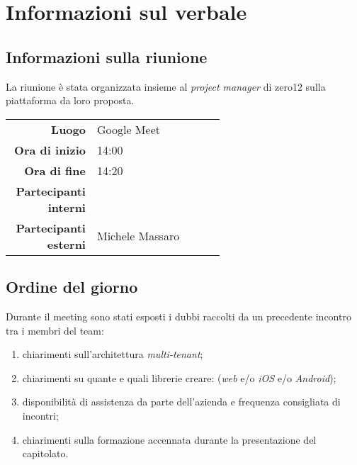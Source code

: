 \section{Informazioni sul verbale}

\subsection{Informazioni sulla riunione}
La riunione è stata organizzata insieme al \textit{project manager} di zero12 sulla piattaforma da loro proposta.

\begin{center}
	\begin{tabular}{r|p{0.6\linewidth}}
		\toprule
		\textbf{Luogo} & Google Meet \\
		\textbf{Ora di inizio} & 14:00 \\
		\textbf{Ora di fine} & 14:20 \\
		\textbf{Partecipanti interni} & \groupTeam \\
		\textbf{Partecipanti esterni} & Michele Massaro
	\end{tabular}
\end{center}

\medskip

\subsection{Ordine del giorno}
Durante il meeting sono stati esposti i dubbi raccolti da un precedente incontro tra i membri del team:
\begin{enumerate}
	\item chiarimenti sull'architettura \emph{multi-tenant};
	\item chiarimenti su quante e quali librerie creare: (\textit{web} e/o \textit{iOS} e/o \textit{Android});
	\item disponibilità di assistenza da parte dell'azienda e frequenza consigliata di incontri;
	\item chiarimenti sulla formazione accennata durante la presentazione del capitolato.
\end{enumerate}
